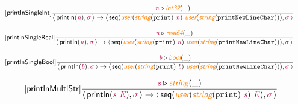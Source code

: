 \documentclass[10pt,leqno,fleqn]{article}
\newcommand{\artVariable}[1]{\mbox{\color{purple}\em #1\/}}
\newcommand{\artConstructor}[1]{\mbox{\sf #1}}
\newcommand{\artCaseInsensitiveLiteral}[1]{\mbox{\tt #1}}
\newcommand{\artSpecial}[1]{\mbox{\color{orange}\sf\em #1}}
\begin{document}
\begin{equation}
\tag*{[\artConstructor{\sf printlnSingleInt}]}
\begin{split}\frac{ \artVariable{n}\triangleright \artSpecial{int32}(\_) }{\langle\, \artConstructor{\sf println}(\artVariable{n}), \artVariable{$\sigma$}\,\rangle \rightarrow \langle\, \artConstructor{\sf seq}(\artSpecial{user}(\artSpecial{string}(\artCaseInsensitiveLiteral{print})\ \artVariable{n})\ \artSpecial{user}(\artSpecial{string}(\artCaseInsensitiveLiteral{printNewLineChar}))), \artVariable{$\sigma$}\,\rangle }
\end{split}
\end{equation}

\begin{equation}
\tag*{[\artConstructor{\sf printlnSingleReal}]}
\begin{split}\frac{ \artVariable{n}\triangleright \artSpecial{real64}(\_) }{\langle\, \artConstructor{\sf println}(\artVariable{n}), \artVariable{$\sigma$}\,\rangle \rightarrow \langle\, \artConstructor{\sf seq}(\artSpecial{user}(\artSpecial{string}(\artCaseInsensitiveLiteral{print})\ \artVariable{n})\ \artSpecial{user}(\artSpecial{string}(\artCaseInsensitiveLiteral{printNewLineChar}))), \artVariable{$\sigma$}\,\rangle }
\end{split}
\end{equation}

\begin{equation}
\tag*{[\artConstructor{\sf printlnSingleBool}]}
\begin{split}\frac{ \artVariable{b}\triangleright \artSpecial{bool}(\_) }{\langle\, \artConstructor{\sf println}(\artVariable{b}), \artVariable{$\sigma$}\,\rangle \rightarrow \langle\, \artConstructor{\sf seq}(\artSpecial{user}(\artSpecial{string}(\artCaseInsensitiveLiteral{print})\ \artVariable{b})\ \artSpecial{user}(\artSpecial{string}(\artCaseInsensitiveLiteral{printNewLineChar}))), \artVariable{$\sigma$}\,\rangle }
\end{split}
\end{equation}

\begin{equation}
\tag*{[\artConstructor{\sf printlnMultiStr}]}
\begin{split}\frac{ \artVariable{s}\triangleright \artSpecial{string}(\_) }{\langle\, \artConstructor{\sf println}(\artVariable{s}\ \artVariable{E}), \artVariable{$\sigma$}\,\rangle \rightarrow \langle\, \artConstructor{\sf seq}(\artSpecial{user}(\artSpecial{string}(\artCaseInsensitiveLiteral{print})\ \artVariable{s})\ \artVariable{E}), \artVariable{$\sigma$}\,\rangle }
\end{split}
\end{equation}
\end{document}
